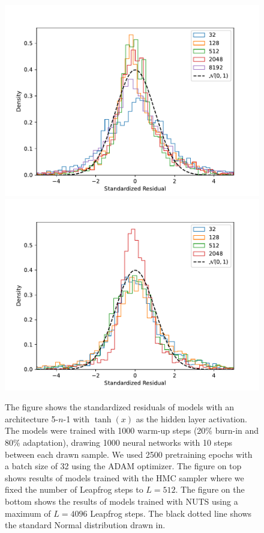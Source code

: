 \begin{figure}[h!]
    \centering
    \includegraphics[scale=0.7]{figures/standardized_residuals/effect_of_num_params/standardized_residual_HMC.pdf}
    \includegraphics[scale=0.7]{figures/standardized_residuals/effect_of_num_params/standardized_residual_NUTS.pdf}
    \caption{
        The figure shows the standardized residuals of models with an architecture 5-$n$-1 with $\tanh(x)$ as the hidden layer activation. The models were trained with 1000 warm-up steps (20\% burn-in and 80\% adaptation), drawing 1000 neural networks with 10 steps between each drawn sample. We used 2500 pretraining epochs with a batch size of 32 using the ADAM optimizer. The figure on top shows results of models trained with the HMC sampler where we fixed the number of Leapfrog steps to $L = 512$. The figure on the bottom shows the results of models trained with NUTS using a maximum of $L = 4096$ Leapfrog steps. The black dotted line shows the standard Normal distribution drawn in.
    }
    \label{fig:standardized_residual_vs_params}
\end{figure}

